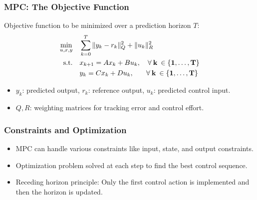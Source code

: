 \documentclass[aspectratio=169,hyperref={pdfpagelabels=false}]{beamer}
\begin{document}
    
\begin{frame} \frametitle{MPC: The Objective Function}
  Objective function to be minimized over a prediction horizon \( T \):
  \begin{equation*}
    \begin{aligned}
    \min_{u, x, y} \quad & \sum_{k=0}^{T} \|y_{k} - r_{k}\|^2_Q + \|u_{k}\|^2_R \\
    \textrm{s.t.} \quad & x_{k+1} = Ax_k + Bu_k, \quad \forall \: \textbf{k} \: \in \{\textbf{1}, \dots, \textbf{T}\}\\
      &y_{k} = Cx_k + D u_k, \quad \hspace{0.8em} \forall \: \textbf{k} \: \in \{\textbf{1}, \dots, \textbf{T}\}\\
    \end{aligned}
  \end{equation*}
  \begin{itemize}
      \item \( y_{k} \): predicted output, \( r_{k} \): reference output, \( u_{k} \): predicted control input.
      \item \( Q, R \): weighting matrices for tracking error and control effort.
  \end{itemize}
    
    \let\thefootnote\relax{}
\end{frame}




  \begin{frame}
  \frametitle{Constraints and Optimization}
  \begin{itemize}
      \item MPC can handle various constraints like input, state, and output constraints.
      \item Optimization problem solved at each step to find the best control sequence.
      \item Receding horizon principle: Only the first control action is implemented and then the horizon is updated.
  \end{itemize}
  \let\thefootnote\relax{}
  \end{frame}
\end{document}
